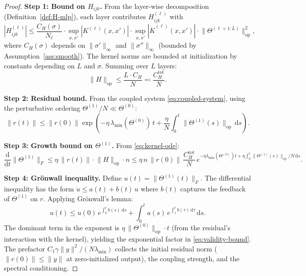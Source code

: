 \documentclass[11pt]{article}
\theoremstyle{definition}
\newcommand{\norm}[1]{\lVert #1 \rVert}
\newcommand{\dd}{\mathrm{d}}
\renewcommand{\Theta}{\varTheta}
\begin{document}
\begin{proof}
\textbf{Step 1: Bound on $H_{ijk}$.} From the layer-wise decomposition (Definition~\ref{def:H-mlp}), each layer contributes $H^{(\ell)}_{ijk}$ with
\begin{equation}
|H^{(\ell)}_{ijk}| \le \frac{C_H(\sigma)}{N_\ell} \cdot \sup_{x,x'} |K^{(\ell)}(x,x')| \cdot \sup_{x,x'} |\dot{K}^{(\ell)}(x,x')| \cdot \norm{\Theta^{(\ell+1:L)}}_{\mathrm{op}}^2,
\end{equation}
where $C_H(\sigma)$ depends on $\norm{\sigma'}_\infty$ and $\norm{\sigma''}_\infty$ (bounded by Assumption~\ref{ass:smooth}). The kernel norms are bounded at initialization by constants depending on $L$ and $\sigma$. Summing over $L$ layers:
\begin{equation}
\norm{H}_{\mathrm{op}} \le \frac{L \cdot C_H}{N} \eqqcolon \frac{C_H^{\mathrm{tot}}}{N}.
\end{equation}

\textbf{Step 2: Residual bound.} From the coupled system \eqref{eq:coupled-system}, using the perturbative ordering $\Theta^{(1)}/N \ll \Theta^{(0)}$:
\begin{equation}
\norm{r(t)} \le \norm{r(0)} \exp\!\left(-\eta\,\lambda_{\min}(\Theta^{(0)})\,t + \frac{\eta}{N}\int_0^t \norm{\Theta^{(1)}(s)}_{\mathrm{op}}\,\dd s\right).
\end{equation}

\textbf{Step 3: Growth bound on $\Theta^{(1)}$.} From \eqref{eq:kernel-ode}:
\begin{equation}
\frac{\dd}{\dd t}\norm{\Theta^{(1)}}_F \le \eta\,\norm{r(t)} \cdot \norm{H}_{\mathrm{op}} \cdot n \le \eta\,n\,\norm{r(0)}\,\frac{C_H^{\mathrm{tot}}}{N}\,e^{-\eta\lambda_{\min}(\Theta^{(0)})t + \eta\int_0^t \norm{\Theta^{(1)}(s)}_{\mathrm{op}}/N\,\dd s}.
\end{equation}

\textbf{Step 4: Gr\"onwall inequality.} Define $u(t) = \norm{\Theta^{(1)}(t)}_F$. The differential inequality has the form $\dot{u} \le a(t) + b(t)\,u$ where $b(t)$ captures the feedback of $\Theta^{(1)}$ on $r$. Applying Gr\"onwall's lemma:
\begin{equation}
u(t) \le u(0)\,e^{\int_0^t b(s)\,\dd s} + \int_0^t a(s)\,e^{\int_s^t b(\tau)\,\dd\tau}\,\dd s.
\end{equation}
The dominant term in the exponent is $\eta\,\norm{\Theta^{(0)}}_{\mathrm{op}} \cdot t$ (from the residual's interaction with the kernel), yielding the exponential factor in \eqref{eq:validity-bound}. The prefactor $C_1 \gamma \norm{y}^2 / (N\lambda_{\min})$ collects the initial residual norm ($\norm{r(0)} \le \norm{y}$ at zero-initialized output), the coupling strength, and the spectral conditioning.
\end{proof}
\end{document}

